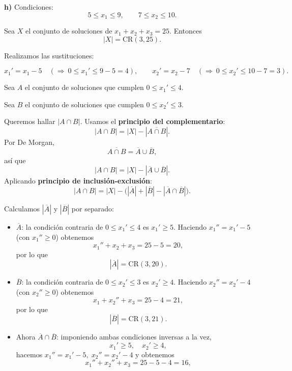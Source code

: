 \documentclass[a4paper,12pt]{article}
\begin{document}
\begin{ejercicio}[title=Ejercicio 31]
\textbf{h)}  
Condiciones:
\[
5 \le x_1 \le 9,\qquad 7 \le x_2 \le 10.
\]

Sea \(X\) el conjunto de soluciones de \(x_1+x_2+x_3=25\).  
Entonces
\[
|X| = \mathrm{CR}(3,25).
\]

Realizamos las sustituciones:

\[
x_1' = x_1 - 5 \quad(\Rightarrow\ 0 \le x_1' \le 9-5= 4), \qquad
x_2' = x_2 - 7 \quad(\Rightarrow\ 0 \le x_2' \le 10-7=3).
\]

Sea \(A\) el conjunto de soluciones que cumplen \(0 \le x_1' \le 4\).  

Sea \(B\) el conjunto de soluciones que cumplen \(0 \le x_2' \le 3\).  

\vspace{0.5em}

Queremos hallar \(|A\cap B|\). Usamos el \textbf{principio del complementario}:
\[
|A\cap B| = |X| - |\overline{A\cap B}|.
\]
Por De Morgan,
\[
\overline{A\cap B}=\overline{A}\cup\overline{B},
\]
así que
\[
|A\cap B| = |X| - |\overline{A}\cup\overline{B}|.
\]
Aplicando \textbf{principio de inclusión-exclusión}:
\[
|A\cap B| = |X| - \big(|\overline{A}| + |\overline{B}| - |\overline{A}\cap\overline{B}|\big).
\]

Calculamos \(|\overline{A}|\) y \(|\overline{B}|\) por separado:

\begin{itemize}
\item \(\overline{A}\): la condición contraria de \(0\le x_1'\le 4\) es \(x_1'\ge 5\).  
Haciendo \(x_1'' = x_1' - 5\) (con \(x_1''\ge 0\)) obtenemos
\[
x_1'' + x_2 + x_3 = 25 - 5 = 20,
\]
por lo que
\[
|\overline{A}| = \mathrm{CR}(3,20).
\]

\item \(\overline{B}\): la condición contraria de \(0\le x_2'\le 3\) es \(x_2'\ge 4\).  
Haciendo \(x_2'' = x_2' - 4\) (con \(x_2''\ge 0\)) obtenemos
\[
x_1 + x_2'' + x_3 = 25 - 4 = 21,
\]
por lo que
\[
|\overline{B}| = \mathrm{CR}(3,21).
\]

\item Ahora \(\overline{A}\cap\overline{B}\): imponiendo ambas condiciones inversas a la vez,
\[
x_1'\ge 5,\quad x_2'\ge 4,
\]
hacemos \(x_1'' = x_1' - 5,\; x_2'' = x_2' - 4\) y obtenemos
\[
x_1'' + x_2'' + x_3 = 25 - 5 - 4 = 16,
\]
\end{itemize}
\end{ejercicio}
\end{document}
